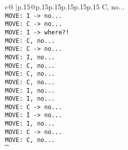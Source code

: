 \documentclass{article}
\begin{document}
{\begin{supertabular}{c@{$\;$}|p{.15\linewidth}@{}p{.15\linewidth}p{.15\linewidth}p{.15\linewidth}p{.15\linewidth}p{.15\linewidth}}
{{{C, no...\\ \tt  MOVE: I -> no...\\ \tt  MOVE: C -> no...\\ \tt  MOVE: I -> where?!\\ \tt  MOVE: C, no...\\ \tt  MOVE: C -> no...\\ \tt  MOVE: I, no...\\ \tt  MOVE: C, no...\\ \tt  MOVE: C, no...\\ \tt  MOVE: C, no...\\ \tt  MOVE: I, no...\\ \tt  MOVE: I, no...\\ \tt  MOVE: C -> no...\\ \tt  MOVE: I -> no...\\ \tt  MOVE: I, no...\\ \tt  MOVE: C -> no...\\ \tt  MOVE: C, no...\\ \t}}}
\end{supertabular}}
\end{document}
